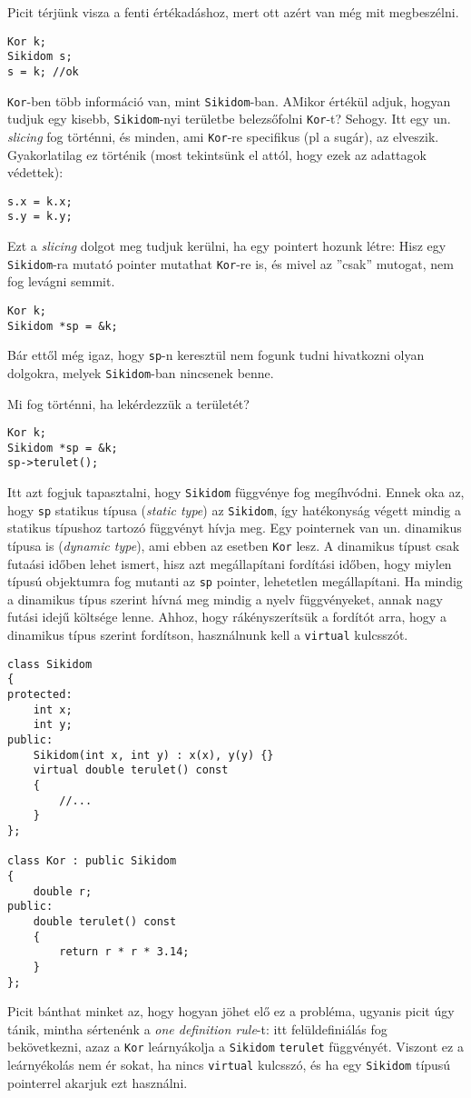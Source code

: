 \documentclass[a4paper,11.5pt]{article}
\begin{document}
	Picit térjünk visza a fenti értékadáshoz, mert ott azért van még mit megbeszélni.
	\begin{lstlisting}
Kor k;
Sikidom s;
s = k; //ok
	\end{lstlisting}
	\texttt{Kor}-ben több információ van, mint \texttt{Sikidom}-ban. AMikor értékül adjuk, hogyan tudjuk egy kisebb, \texttt{Sikidom}-nyi területbe belezsőfolni \texttt{Kor}-t? Sehogy. Itt egy un. \textit{slicing} fog történni, és minden, ami \texttt{Kor}-re specifikus (pl a sugár), az elveszik. Gyakorlatilag ez történik (most tekintsünk el attól, hogy ezek az adattagok védettek):
	\begin{lstlisting}
s.x = k.x;
s.y = k.y;
	\end{lstlisting}
	
	Ezt a \textit{slicing} dolgot meg tudjuk kerülni, ha egy pointert hozunk létre: Hisz egy \texttt{Sikidom}-ra mutató pointer mutathat \texttt{Kor}-re is, és mivel az ''csak'' mutogat, nem fog levágni semmit. 
	\begin{lstlisting}
Kor k;
Sikidom *sp = &k;
	\end{lstlisting}
	Bár ettől még igaz, hogy \texttt{sp}-n keresztül nem fogunk tudni hivatkozni olyan dolgokra, melyek \texttt{Sikidom}-ban nincsenek benne.
	
	Mi fog történni, ha lekérdezzük a területét?
	\begin{lstlisting}
Kor k;
Sikidom *sp = &k;
sp->terulet();
	\end{lstlisting}
	Itt azt fogjuk tapasztalni, hogy \texttt{Sikidom} függvénye fog megíhvódni. Ennek oka az, hogy \texttt{sp} statikus típusa (\textit{static type}) az \texttt{Sikidom}, így hatékonyság végett mindig a statikus típushoz tartozó függvényt hívja meg. Egy pointernek van un. dinamikus típusa is (\textit{dynamic type}), ami ebben az esetben \texttt{Kor} lesz. A dinamikus típust csak futaási időben lehet ismert, hisz azt megállapítani fordítási időben, hogy miylen típusú objektumra fog mutanti az \texttt{sp} pointer, lehetetlen megállapítani. Ha mindig a dinamikus típus szerint hívná meg mindig a nyelv függvényeket, annak nagy futási idejű költsége lenne. Ahhoz, hogy rákényszerítsük a fordítót arra, hogy a dinamikus típus szerint fordítson, használnunk kell a \texttt{virtual} kulcsszót.
\begin{lstlisting}
class Sikidom
{
protected:
	int x;
	int y;
public:
	Sikidom(int x, int y) : x(x), y(y) {}
	virtual double terulet() const
	{
		//...
	}
};

class Kor : public Sikidom
{
	double r;
public:
	double terulet() const
	{
		return r * r * 3.14;
	}
};
\end{lstlisting}
	Picit bánthat minket az, hogy hogyan jöhet elő ez a probléma, ugyanis picit úgy tánik, mintha sértenénk a \textit{one definition rule}-t: itt felüldefiniálás fog bekövetkezni, azaz a \texttt{Kor} leárnyákolja a \texttt{Sikidom} \texttt{terulet} függvényét. Viszont ez a leárnyékolás nem ér sokat, ha nincs \texttt{virtual} kulcsszó, és ha egy \texttt{Sikidom} típusú pointerrel akarjuk ezt használni.
	
\end{document}
